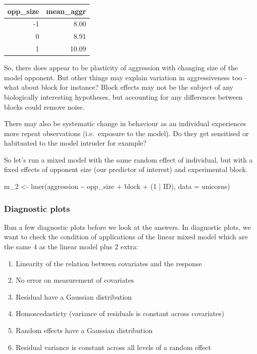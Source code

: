 \documentclass[
  12pt,
]{book}
\newenvironment{Shaded}{\begin{snugshade}}{\end{snugshade}}
\newcommand{\AttributeTok}[1]{\textcolor[rgb]{0.77,0.63,0.00}{#1}}
\newcommand{\DecValTok}[1]{\textcolor[rgb]{0.00,0.00,0.81}{#1}}
\newcommand{\FunctionTok}[1]{\textcolor[rgb]{0.00,0.00,0.00}{#1}}
\newcommand{\NormalTok}[1]{#1}
\newcommand{\OtherTok}[1]{\textcolor[rgb]{0.56,0.35,0.01}{#1}}
\newcommand{\SpecialCharTok}[1]{\textcolor[rgb]{0.00,0.00,0.00}{#1}}
\begin{document}
\begin{tabular}{r|r}
\hline
opp\_size & mean\_aggr\\
\hline
-1 & 8.00\\
\hline
0 & 8.91\\
\hline
1 & 10.09\\
\hline
\end{tabular}

So, there does appear to be plasticity of aggression with changing size of the model opponent. But other things may explain variation in aggressiveness too - what about block for instance? Block effects may not be the subject of any biologically interesting hypotheses, but accounting for any differences between blocks could remove noise.

There may also be systematic change in behaviour as an individual experiences more repeat observations (i.e.~exposure to the model). Do they get sensitised or habituated to the model intruder for example?

So let's run a mixed model with the same random effect of individual, but with a fixed effects of opponent size (our predictor of interest) and experimental block.

\begin{Shaded}
\begin{Highlighting}[]
\NormalTok{m\_2 }\OtherTok{\textless{}{-}} \FunctionTok{lmer}\NormalTok{(aggression }\SpecialCharTok{\textasciitilde{}}\NormalTok{ opp\_size  }\SpecialCharTok{+}\NormalTok{ block }\SpecialCharTok{+}\NormalTok{ (}\DecValTok{1} \SpecialCharTok{|}\NormalTok{ ID), }\AttributeTok{data =}\NormalTok{ unicorns)}
\end{Highlighting}
\end{Shaded}

\hypertarget{diagnostic-plots}{%
\subsubsection{Diagnostic plots}\label{diagnostic-plots}}

Run a few diagnostic plots before we look at the answers. In diagnostic plots, we want to check the condition of applications of the linear mixed model which are the same 4 as the linear model plus 2 extra:

\begin{enumerate}
\def\labelenumi{\arabic{enumi}.}
\item
  Linearity of the relation between covariates and the response
\item
  No error on measurement of covariates
\item
  Residual have a Gaussian distribution
\item
  Homoscedasticty (variance of residuals is constant across covariates)
\item
  Random effects have a Gaussian distribution
\item
  Residual variance is constant across all levels of a random effect
\end{enumerate}
\end{document}
